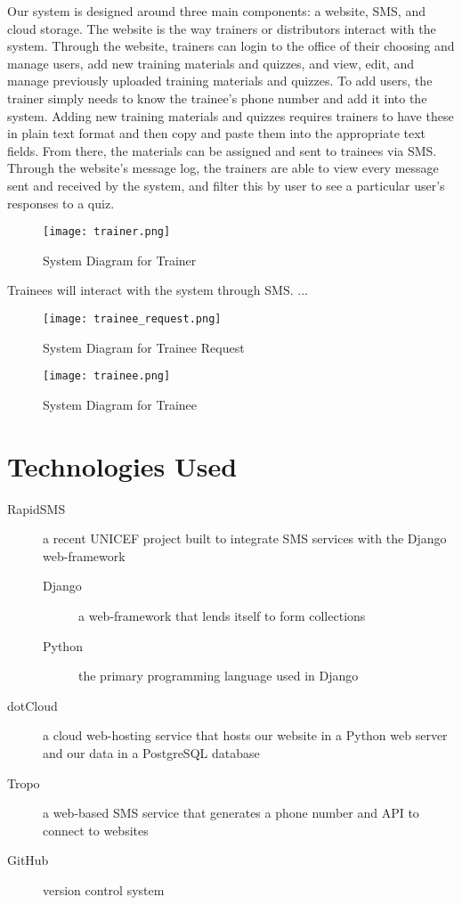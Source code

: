 Our system is designed around three main components: a website, SMS, and cloud storage. The website is the way trainers or distributors interact with the system. Through the website, trainers can login to the office of their choosing and manage users, add new training materials and quizzes, and view, edit, and manage previously uploaded training materials and quizzes. To add users, the trainer simply needs to know the trainee's phone number and add it into the system. Adding new training materials and quizzes requires trainers to have these in plain text format and then copy and paste them into the appropriate text fields. From there, the materials can be assigned and sent to trainees via SMS. Through the website's message log, the trainers are able to view every message sent and received by the system, and filter this by user to see a particular user's responses to a quiz.

\begin{figure}[H]
	\centering
	\texttt{[image: trainer.png]}
	\caption{System Diagram for Trainer}
\end{figure}

Trainees will interact with the system through SMS. ...

\begin{figure}[H]
	\centering
	\texttt{[image: trainee\_request.png]}
	\caption{System Diagram for Trainee Request}
\end{figure}

\begin{figure}[H]
	\centering
	\texttt{[image: trainee.png]}
	\caption{System Diagram for Trainee}
\end{figure}

\section{Technologies Used}
\begin{description}
	\item[RapidSMS] a recent UNICEF project built to integrate SMS services with the Django web-framework
	\begin{description}
		\item[Django] a web-framework that lends itself to form collections
		\item[Python] the primary programming language used in Django
	\end{description}
	\item[dotCloud] a cloud web-hosting service that hosts our website in a Python web server and our data in a PostgreSQL database
	\item[Tropo] a web-based SMS service that generates a phone number and API to connect to websites
	\item[GitHub] version control system
\end{description}


